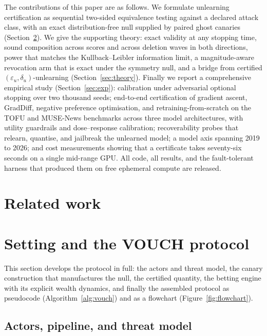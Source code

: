 \documentclass[pdflatex,sn-mathphys-num]{sn-jnl}
\theoremstyle{thmstyleone}
\theoremstyle{thmstyletwo}
\theoremstyle{thmstylethree}
\newcommand{\eps}{\varepsilon}
\begin{document}
The contributions of this paper are as follows. We formulate unlearning certification
as sequential two-sided equivalence testing against a declared attack class, with an
exact distribution-free null supplied by paired ghost canaries
(Section~\ref{sec:framework}). We give the supporting theory: exact validity at any
stopping time, sound composition across scores and across deletion waves in both
directions, power that matches the Kullback--Leibler information limit, a
magnitude-aware revocation arm that is exact under the symmetry null, and a bridge from
certified $(\eps_u,\delta_u)$-unlearning (Section~\ref{sec:theory}). Finally we report a
comprehensive empirical study (Section~\ref{sec:exp}): calibration under adversarial
optional stopping over two thousand seeds; end-to-end certification of gradient ascent,
GradDiff, negative preference optimisation, and retraining-from-scratch on the TOFU and
MUSE-News benchmarks across three model architectures, with utility guardrails and
dose--response calibration; recoverability probes that relearn, quantise, and jailbreak
the unlearned model; a model axis spanning 2019 to 2026; and cost measurements showing
that a certificate takes seventy-six seconds on a single mid-range GPU. All code, all
results, and the fault-tolerant harness that produced them on free ephemeral compute are
released.

\section{Related work}\label{sec:related}


\section{Setting and the VOUCH protocol}\label{sec:framework}

This section develops the protocol in full: the actors and threat model, the canary
construction that manufactures the null, the certified quantity, the betting engine
with its explicit wealth dynamics, and finally the assembled protocol as pseudocode
(Algorithm~\ref{alg:vouch}) and as a flowchart (Figure~\ref{fig:flowchart}).

\subsection{Actors, pipeline, and threat model}\label{sec:setting}
\end{document}
